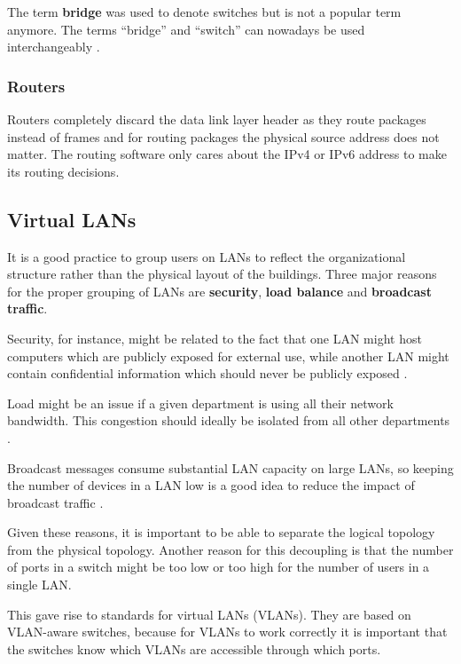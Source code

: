 \documentclass[12pt, oneside]{book}
\begin{document}
The term \textbf{bridge} was used to denote switches but is not a popular term anymore. The terms ``bridge'' and ``switch'' can nowadays be used interchangeably \cite[p.~350]{computer-networks-tanenbaum-2012}.

\subsubsection{Routers}

Routers completely discard the data link layer header as they route packages instead of frames and for routing packages the physical source address does not matter.
The routing software only cares about the IPv4 or IPv6 address to make its routing decisions.

\subsection{Virtual LANs}

It is a good practice to group users on LANs to reflect the organizational structure rather than the physical layout of the buildings. Three major reasons for the proper grouping of LANs are \textbf{security}, \textbf{load balance} and \textbf{broadcast traffic}.

Security, for instance, might be related to the fact that one LAN might host computers which are publicly exposed for external use, while another LAN might contain confidential information which should never be publicly exposed  \cite[p.~343]{computer-networks-tanenbaum-2012}.

Load might be an issue if a given department is using all their network bandwidth. This congestion should ideally be isolated from all other departments \cite[p.~344]{computer-networks-tanenbaum-2012}.

Broadcast messages consume substantial LAN capacity on large LANs, so keeping the number of devices in a LAN low is a good idea to reduce the impact of broadcast traffic \cite[p.~344]{computer-networks-tanenbaum-2012}.

Given these reasons, it is important to be able to separate the logical topology from the physical topology.
Another reason for this decoupling is that the number of ports in a switch might be too low or too high for the number of users in a single LAN.

This gave rise to standards for virtual LANs (VLANs). They are based on VLAN-aware switches, because for VLANs to work correctly it is important that the switches know which VLANs are accessible through which ports.
\end{document}
